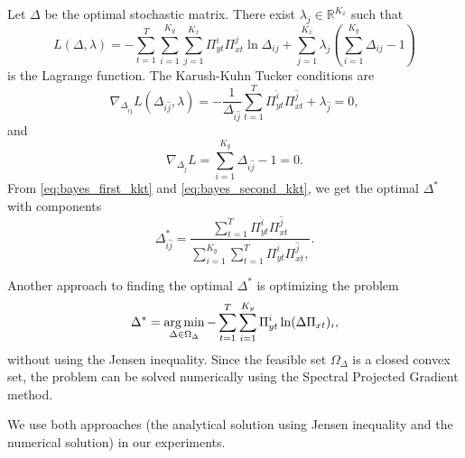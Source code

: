 Let $\Delta$ be the optimal stochastic matrix. There exist $\lambda_j \in \mathbb{R}^{K_x}$ such that
\begin{equation}
    L(\Delta, \lambda) = - \sum_{t=1}^T \sum_{i=1}^{K_y} \sum_{j=1}^{K_x} \Pi_{yt}^i \Pi_{xt}^j \ln \Delta_{ij} + \sum_{j=1}^{K_x} \lambda_j (\sum_{i=1}^{K_y} \Delta_{ij} - 1)
\end{equation}
is the Lagrange function. The Karush-Kuhn Tucker conditions are
\begin{equation}
    \nabla_{\Delta_{\hat{i}\hat{j}}} L(\Delta_{\hat{i}\hat{j}}, \lambda) = - \frac{1}{\Delta_{\hat{i}\hat{j}}} \sum_{t=1}^{T} \Pi_{yt}^{\hat{i}} \Pi_{xt}^{\hat{j}} + \lambda_{\hat{j}} = 0,
    \label{eq:bayes_first_kkt}
\end{equation}
and
\begin{equation}
    \nabla_{\Delta_{\hat{j}}} L = \sum_{i=1}^{K_y} \Delta_{i\hat{j}} - 1 = 0.
    \label{eq:bayes_second_kkt}
\end{equation}
From \eqref{eq:bayes_first_kkt} and \eqref{eq:bayes_second_kkt}, we get the optimal $\Delta^*$ with components
\begin{equation}
    \Delta_{\hat{i}\hat{j}}^{*} = \frac{\sum_{t=1}^{T} \Pi_{yt}^{\hat{i}} \Pi_{xt}^{\hat{j}}}{\sum_{i=1}^{K_y} \sum_{t=1}^{T} \Pi_{yt}^{i} \Pi_{xt}^{\hat{j}},}.
\end{equation}

Another approach to finding the optimal $\Delta^{*}$ is optimizing the problem
\begin{equation}
    \Delta^* = \operatorname*{arg\,min}_{\Delta \in \Omega_{\Delta}} - \sum_{t=1}^T \sum_{i=1}^{K_y} \Pi_{yt}^i \ln (\Delta\Pi_{xt})_i,
\end{equation}
without using the Jensen inequality. Since the feasible set $\Omega_{\Delta}$ is a closed convex set, the problem can be solved numerically using the Spectral Projected Gradient method\cite{birgin2000}.

We use both approaches (the analytical solution using Jensen inequality and the numerical solution) in our experiments.
